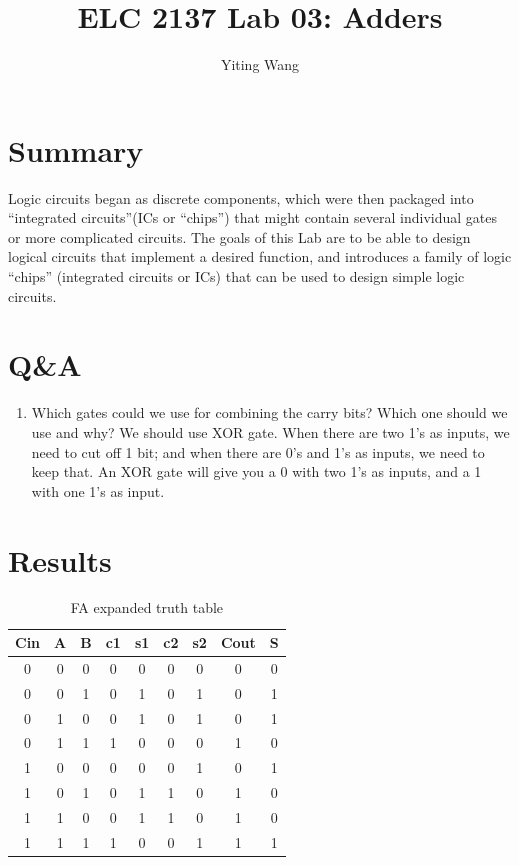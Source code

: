 \documentclass[11pt]{article}
\begin{document}
\title{ELC 2137 Lab 03: Adders}
\author{Yiting Wang}

\maketitle


\section*{Summary}

    Logic circuits began as discrete components, which were then packaged into “integrated circuits”(ICs or “chips”)
    that might contain several individual gates or more complicated circuits. The goals of this Lab are to be able to
    design logical circuits that implement a desired function, and introduces a family of logic “chips” (integrated
    circuits or ICs) that can be used to design simple logic circuits.




\section*{Q\&A}

    \begin{enumerate}
	    \item Which gates could we use for combining the carry bits? Which one should we use and why?
	        We should use XOR gate. When there are two 1’s as inputs, we need to cut off 1 bit; and when there are 0's and 1’s as inputs, we need to keep that. An XOR gate will give you a 0 with two 1’s as inputs, and a 1 with
			one 1's as input.
	\end{enumerate}


\section*{Results}

    \begin{table}[ht]\centering
        \caption{FA expanded truth table}
        \label{tbl:FA expanded truth table}
        \begin{tabular}{ccc|cccc|cc}
            \toprule
            Cin & A & B & c1 & s1 & c2 & s2 & Cout & S \\
            \midrule
            0 & 0 & 0 & 0 & 0 & 0 & 0 & 0 & 0 \\
            0 & 0 & 1 & 0 & 1 & 0 & 1 & 0 & 1 \\
            0 & 1 & 0 & 0 & 1 & 0 & 1 & 0 & 1 \\
            0 & 1 & 1 & 1 & 0 & 0 & 0 & 1 & 0 \\
		    1 & 0 & 0 & 0 & 0 & 0 & 1 & 0 & 1 \\
		    1 & 0 & 1 & 0 & 1 & 1 & 0 & 1 & 0 \\
		    1 & 1 & 0 & 0 & 1 & 1 & 0 & 1 & 0 \\
		    1 & 1 & 1 & 1 & 0 & 0 & 1 & 1 & 1 \\
            \bottomrule
        \end{tabular}
    \end{table}
\end{document}
